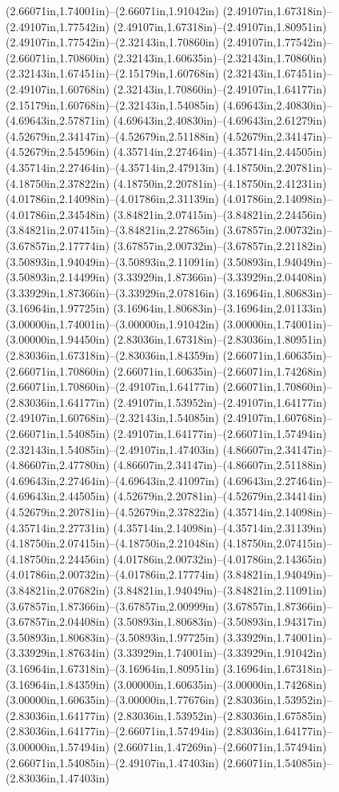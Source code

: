 (2.66071in,1.74001in)--(2.66071in,1.91042in) (2.49107in,1.67318in)--(2.49107in,1.77542in) (2.49107in,1.67318in)--(2.49107in,1.80951in) (2.49107in,1.77542in)--(2.32143in,1.70860in) (2.49107in,1.77542in)--(2.66071in,1.70860in) (2.32143in,1.60635in)--(2.32143in,1.70860in) (2.32143in,1.67451in)--(2.15179in,1.60768in) (2.32143in,1.67451in)--(2.49107in,1.60768in) (2.32143in,1.70860in)--(2.49107in,1.64177in) (2.15179in,1.60768in)--(2.32143in,1.54085in) (4.69643in,2.40830in)--(4.69643in,2.57871in) (4.69643in,2.40830in)--(4.69643in,2.61279in) (4.52679in,2.34147in)--(4.52679in,2.51188in) (4.52679in,2.34147in)--(4.52679in,2.54596in) (4.35714in,2.27464in)--(4.35714in,2.44505in) (4.35714in,2.27464in)--(4.35714in,2.47913in) (4.18750in,2.20781in)--(4.18750in,2.37822in) (4.18750in,2.20781in)--(4.18750in,2.41231in) (4.01786in,2.14098in)--(4.01786in,2.31139in) (4.01786in,2.14098in)--(4.01786in,2.34548in) (3.84821in,2.07415in)--(3.84821in,2.24456in) (3.84821in,2.07415in)--(3.84821in,2.27865in) (3.67857in,2.00732in)--(3.67857in,2.17774in) (3.67857in,2.00732in)--(3.67857in,2.21182in) (3.50893in,1.94049in)--(3.50893in,2.11091in) (3.50893in,1.94049in)--(3.50893in,2.14499in) (3.33929in,1.87366in)--(3.33929in,2.04408in) (3.33929in,1.87366in)--(3.33929in,2.07816in) (3.16964in,1.80683in)--(3.16964in,1.97725in) (3.16964in,1.80683in)--(3.16964in,2.01133in) (3.00000in,1.74001in)--(3.00000in,1.91042in) (3.00000in,1.74001in)--(3.00000in,1.94450in) (2.83036in,1.67318in)--(2.83036in,1.80951in) (2.83036in,1.67318in)--(2.83036in,1.84359in) (2.66071in,1.60635in)--(2.66071in,1.70860in) (2.66071in,1.60635in)--(2.66071in,1.74268in) (2.66071in,1.70860in)--(2.49107in,1.64177in) (2.66071in,1.70860in)--(2.83036in,1.64177in) (2.49107in,1.53952in)--(2.49107in,1.64177in) (2.49107in,1.60768in)--(2.32143in,1.54085in) (2.49107in,1.60768in)--(2.66071in,1.54085in) (2.49107in,1.64177in)--(2.66071in,1.57494in) (2.32143in,1.54085in)--(2.49107in,1.47403in) (4.86607in,2.34147in)--(4.86607in,2.47780in) (4.86607in,2.34147in)--(4.86607in,2.51188in) (4.69643in,2.27464in)--(4.69643in,2.41097in) (4.69643in,2.27464in)--(4.69643in,2.44505in) (4.52679in,2.20781in)--(4.52679in,2.34414in) (4.52679in,2.20781in)--(4.52679in,2.37822in) (4.35714in,2.14098in)--(4.35714in,2.27731in) (4.35714in,2.14098in)--(4.35714in,2.31139in) (4.18750in,2.07415in)--(4.18750in,2.21048in) (4.18750in,2.07415in)--(4.18750in,2.24456in) (4.01786in,2.00732in)--(4.01786in,2.14365in) (4.01786in,2.00732in)--(4.01786in,2.17774in) (3.84821in,1.94049in)--(3.84821in,2.07682in) (3.84821in,1.94049in)--(3.84821in,2.11091in) (3.67857in,1.87366in)--(3.67857in,2.00999in) (3.67857in,1.87366in)--(3.67857in,2.04408in) (3.50893in,1.80683in)--(3.50893in,1.94317in) (3.50893in,1.80683in)--(3.50893in,1.97725in) (3.33929in,1.74001in)--(3.33929in,1.87634in) (3.33929in,1.74001in)--(3.33929in,1.91042in) (3.16964in,1.67318in)--(3.16964in,1.80951in) (3.16964in,1.67318in)--(3.16964in,1.84359in) (3.00000in,1.60635in)--(3.00000in,1.74268in) (3.00000in,1.60635in)--(3.00000in,1.77676in) (2.83036in,1.53952in)--(2.83036in,1.64177in) (2.83036in,1.53952in)--(2.83036in,1.67585in) (2.83036in,1.64177in)--(2.66071in,1.57494in) (2.83036in,1.64177in)--(3.00000in,1.57494in) (2.66071in,1.47269in)--(2.66071in,1.57494in) (2.66071in,1.54085in)--(2.49107in,1.47403in) (2.66071in,1.54085in)--(2.83036in,1.47403in) 